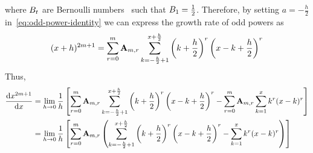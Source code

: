 where ${B}\sb{t}$ are Bernoulli numbers~\cite{bateman1953higher} such that ${B}\sb{1}=\frac{1}{2}$.
Therefore, by setting $a=-\frac{h}{2}$ in~\eqref{eq:odd-power-identity} we can express the growth rate of odd powers as
\begin{align*}
(x+h)
    ^{2m+1} = \sum_{r=0}^{m} {\mathbf{A}} \sb{m,r}
    \sum_{k=-\frac{h}{2}+1}^{x+\frac{h}{2}} \left( k+\frac{h}{2} \right)^{r} \left(x-k+\frac{h}{2} \right)^{r}
\end{align*}
Thus,
\begin{align*}
    \odv{x^{2m+1}}{x}
    &= \lim_{h \to 0} \frac{1}{h} \left[ \sum_{r=0}^{m} \coeffA{m}{r} \sum_{k=-\frac{h}{2}+1}^{x+\frac{h}{2}} \left( k+\frac{h}{2} \right)^{r} \left(x-k+\frac{h}{2} \right)^{r}- \sum_{r=0}^{m} \coeffA{m}{r} \sum_{k=1}^{x} k^r (x-k)^r\right] \\
    &= \lim_{h \to 0} \frac{1}{h} \left[ \sum_{r=0}^{m} \coeffA{m}{r} \left( \sum_{k=-\frac{h}{2}+1}^{x+\frac{h}{2}} \left( k+\frac{h}{2} \right)^{r} \left(x-k+\frac{h}{2} \right)^{r}- \sum_{k=1}^{x} k^r (x-k)^r \right) \right] \\
\end{align*}
